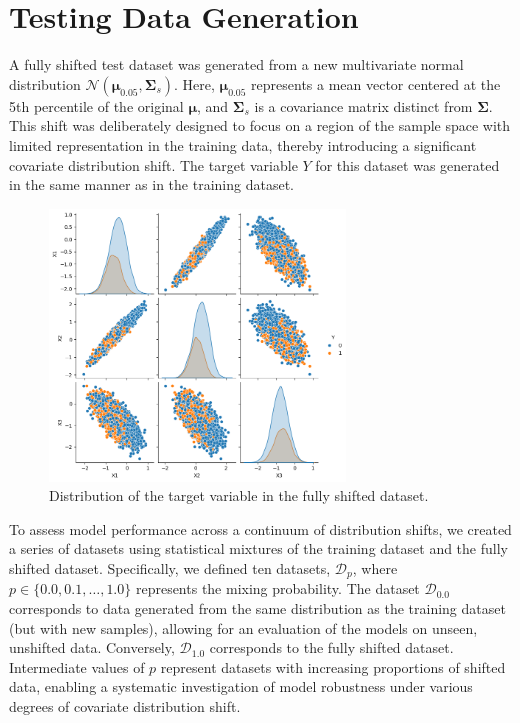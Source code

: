 \section{Testing Data Generation}
A fully shifted test dataset was generated from a new multivariate normal distribution $\mathcal{N}(\boldsymbol{\mu}_{0.05}, \boldsymbol{\Sigma}_s)$. Here, $\boldsymbol{\mu}_{0.05}$ represents a mean vector centered at the 5th percentile of the original $\boldsymbol{\mu}$, and $\boldsymbol{\Sigma}_s$ is a covariance matrix distinct from $\boldsymbol{\Sigma}$. This shift was deliberately designed to focus on a region of the sample space with limited representation in the training data, thereby introducing a significant covariate distribution shift. The target variable $Y$ for this dataset was generated in the same manner as in the training dataset.

\begin{figure}[H]
    \centering
    \includegraphics[width=0.7\textwidth]{assets/label_dist_fullyshift.png}
    \caption{Distribution of the target variable in the fully shifted dataset.}
    \label{fig:label_dist_fullyshift}
\end{figure}

To assess model performance across a continuum of distribution shifts, we created a series of datasets using statistical mixtures of the training dataset and the fully shifted dataset. Specifically, we defined ten datasets, $\mathcal{D}_p$, where $p \in \{0.0, 0.1, \ldots, 1.0\}$ represents the mixing probability. The dataset $\mathcal{D}_{0.0}$ corresponds to data generated from the same distribution as the training dataset (but with new samples), allowing for an evaluation of the models on unseen, unshifted data. Conversely, $\mathcal{D}_{1.0}$ corresponds to the fully shifted dataset. Intermediate values of $p$ represent datasets with increasing proportions of shifted data, enabling a systematic investigation of model robustness under various degrees of covariate distribution shift.


